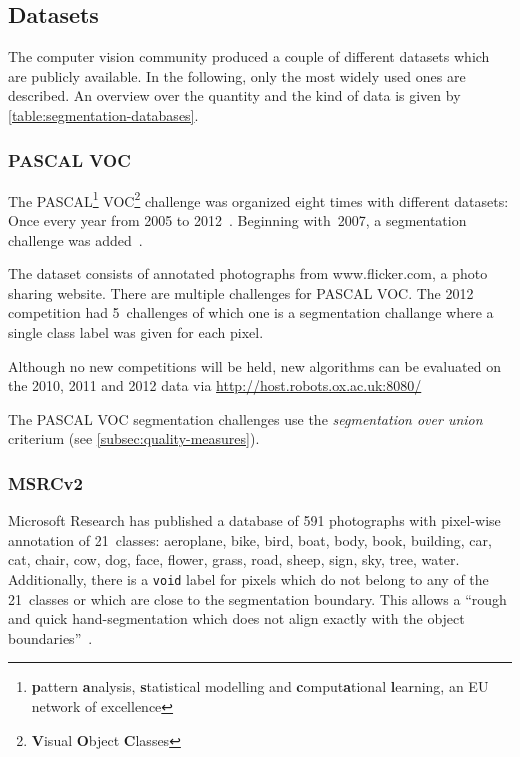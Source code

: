 
\subsection{Datasets}

The computer vision community produced a couple of different datasets which are
publicly available. In the following, only the most widely used ones are
described. An overview over the quantity and the kind of data is given by
\cref{table:segmentation-databases}.


\subsubsection{PASCAL VOC}

The PASCAL\footnote{\textbf{p}attern \textbf{a}nalysis, \textbf{s}tatistical
modelling and \textbf{c}omput\textbf{a}tional \textbf{l}earning, an EU network
of excellence} VOC\footnote{\textbf{V}isual \textbf{O}bject \textbf{C}lasses}
challenge was organized eight times with different datasets: Once every year
from 2005 to 2012~\cite{pascal-voc-2012}. Beginning with~2007, a segmentation
challenge was added~\cite{pascal-voc-2007}.

The dataset consists of annotated photographs from www.flicker.com, a photo
sharing website. There are multiple challenges for PASCAL VOC. The 2012
competition had 5~challenges of which one is a segmentation challange where
a single class label was given for each pixel.

Although no new competitions will be held, new algorithms can be evaluated on
the 2010, 2011 and 2012 data via
\href{http://host.robots.ox.ac.uk:8080/}{http://host.robots.ox.ac.uk:8080/}

The PASCAL VOC segmentation challenges use the \textit{segmentation over union}
criterium (see \cref{subsec:quality-measures}).


\subsubsection{MSRCv2}

Microsoft Research has published a database of 591 photographs with pixel-wise
annotation of 21~classes: aeroplane, bike, bird, boat, body,
book, building, car, cat, chair, cow, dog, face, flower, grass, road, sheep,
sign, sky, tree, water. Additionally, there is a \texttt{void} label for pixels
which do not belong to any of the 21~classes or which are close to the
segmentation boundary. This allows a \enquote{rough and quick hand-segmentation
which does not align exactly with the object boundaries}~\cite{shotton2006textonboost}.

